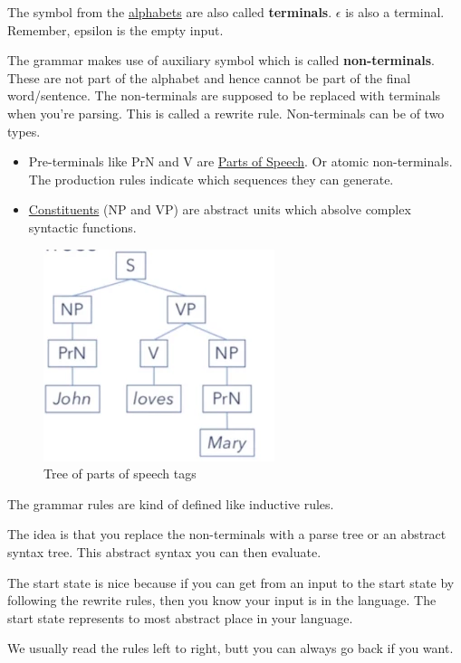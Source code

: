 \documentclass[
  11pt,
  british,
]{article}
\providecommand{\tightlist}{%
  \setlength{\itemsep}{0pt}\setlength{\parskip}{0pt}}
\begin{document}
The symbol from the \href{Alphabet.md}{alphabets} are also called
\textbf{terminals}. \(\epsilon\) is also a terminal. Remember, epsilon
is the empty input.

The grammar makes use of auxiliary symbol which is called
\textbf{non-terminals}. These are not part of the alphabet and hence
cannot be part of the final word/sentence. The non-terminals are
supposed to be replaced with terminals when you're parsing. This is
called a rewrite rule. Non-terminals can be of two types.

\begin{itemize}
\tightlist
\item
  Pre-terminals like PrN and V are \href{Parts\%20of\%20Speech.md}{Parts
  of Speech}. Or atomic non-terminals. The production rules indicate
  which sequences they can generate.
\item
  \href{Constituency.md}{Constituents} (NP and VP) are abstract units
  which absolve complex syntactic functions.
\end{itemize}

\begin{figure}
\centering
\includegraphics{Pasted_image_20220314185901.png}
\caption{Tree of parts of speech tags}
\end{figure}

The grammar rules are kind of defined like inductive rules.

The idea is that you replace the non-terminals with a parse tree or an
abstract syntax tree. This abstract syntax you can then evaluate.

The start state is nice because if you can get from an input to the
start state by following the rewrite rules, then you know your input is
in the language. The start state represents to most abstract place in
your language.

We usually read the rules left to right, butt you can always go back if
you want.
\end{document}
